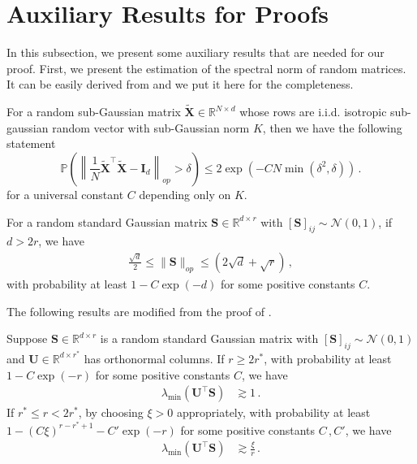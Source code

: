 \section{Auxiliary Results for Proofs}
\label{auxiliary}
In this subsection, we present some auxiliary results that are needed for our proof.
First, we present the estimation of the spectral norm of random matrices.
It can be easily derived from \cite{vershynin2018high} and we put it here for the completeness.

\begin{lemma}\citep[Adapted from Theorem 4.6.1]{vershynin2018high}
\label{lem:conrg}
    For a random sub-Gaussian matrix $\widetilde{\bm X} \in \mathbb{R}^{N \times d}$ whose rows are i.i.d. isotropic sub-gaussian random vector with sub-Gaussian norm $K$, then we have the following statement
\[
\mathbb{P} \left(   \left\|\frac{1}{N}\widetilde{\bm X}^{\!\top}\widetilde{\bm X}-\bm I_d\right\|_{op}  > \delta \right) \leq 2 \exp \left( -C N \min\left(\delta^2, \delta\right) \right)\,.
\]
for a universal constant $C$ depending only on $K$.
\end{lemma}

\begin{lemma}\citep[Adapted from Corollary 5.35]{vershynin2010introduction}
\label{lem:init-op-conct}
    For a random standard Gaussian matrix $\bm S\in\mathbb{R}^{d\times r}$ with $[\bm S]_{ij} \sim \mathcal{N}(0, 1)$, if $d > 2r$, we have 
    \begin{align}
        \label{norm-A0}
        \frac{\sqrt{d}}{2} \leq \|\bm S\|_{op} \leq (2 \sqrt{d} + \sqrt{r})\,,
    \end{align}
    with probability at least $1-C \operatorname{exp}(-d)$ for some positive constants $C$.
\end{lemma}

The following results are modified from the proof of \citet[Lemma 8.7]{stoger2021small}.
\begin{lemma}
\label{lem:min-singular-conct}
    Suppose $\bm S\in\mathbb{R}^{d\times r}$ is a random standard Gaussian matrix with $[\bm S]_{ij} \sim \mathcal{N}(0, 1)$ and $\bm U\in\mathbb{R}^{d\times r^*}$ has orthonormal columns. If $r\geq 2r^*$, with probability at least $1-C\operatorname{exp}(-r)$ for some positive constants $C$, we have
    \begin{align*}
        \lambda_{\operatorname{min}}(\bm U^{\!\top}\bm S) & \gtrsim 1\,.
    \end{align*}
    If $r^*\leq r < 2r^*$, by choosing $\xi>0$ appropriately, with probability at least $1-(C \xi)^{r-r^*+1}-C'\operatorname{exp}(-r)$ for some positive constants $C\,,C'$, we have
    \begin{align*}
        \lambda_{\operatorname{min}}(\bm U^{\!\top}\bm S) & \gtrsim \frac{\xi}{r}\,.
    \end{align*}
\end{lemma}

